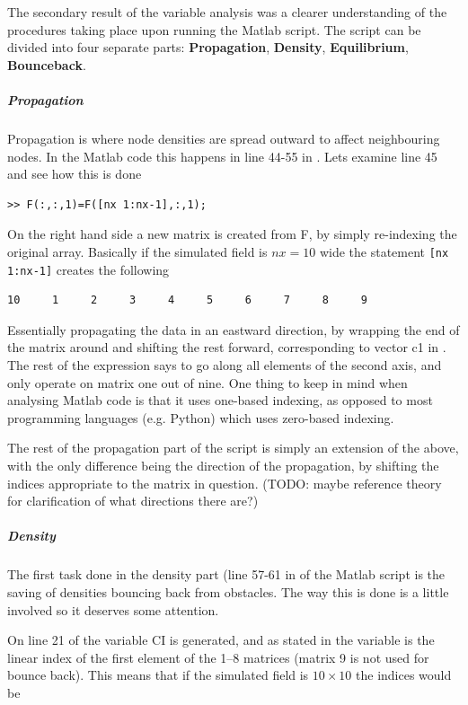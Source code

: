 The secondary result of the variable analysis was a clearer understanding of the procedures taking place upon running the Matlab script. The script can be divided into four separate parts: \textbf{Propagation}, \textbf{Density}, \textbf{Equilibrium}, \textbf{Bounceback}.

\subparagraph{Propagation} 
Propagation is where node densities are spread outward to affect neighbouring nodes. In the Matlab code this happens in line 44-55 in . Lets examine line 45 and see how this is done

\begin{verbatim}
>> F(:,:,1)=F([nx 1:nx-1],:,1);
\end{verbatim}

On the right hand side a new matrix is created from F, by simply re-indexing the original array. Basically if the simulated field is $nx=10$ wide the statement \texttt{[nx 1:nx-1]} creates the following

\begin{verbatim}
10     1     2     3     4     5     6     7     8     9
\end{verbatim}

Essentially propagating the data in an eastward direction, by wrapping the end of the matrix around and shifting the rest forward, corresponding to vector c1 in . The rest of the expression says to go along all elements of the second axis, and only operate on matrix one out of nine. One thing to keep in mind when analysing Matlab code is that it uses one-based indexing, as opposed to most programming languages (e.g. Python) which uses zero-based indexing.

The rest of the propagation part of the script is simply an extension of the above, with the only difference being the direction of the propagation, by shifting the indices appropriate to the matrix in question. (TODO: maybe reference theory for clarification of what directions there are?)

\subparagraph*{Density}
The first task done in the density part (line 57-61 in  of the Matlab script is the saving of densities bouncing back from obstacles. The way this is done is a little involved so it deserves some attention.

On line 21 of  the variable CI is generated, and as stated in  the variable is the linear index of the first element of the 1--8 matrices (matrix 9 is not used for bounce back). This means that if the simulated field is $10\times10$ the indices would be

